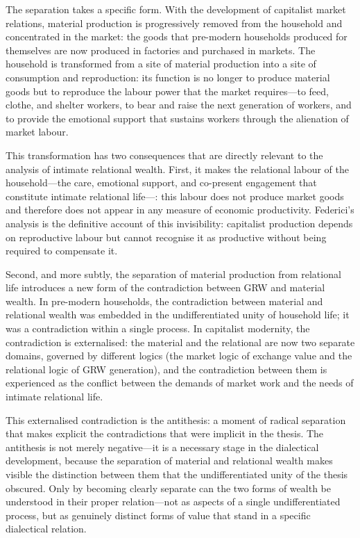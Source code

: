 The separation takes a specific form. With the development of capitalist market relations, material production is progressively removed from the household and concentrated in the market: the goods that pre-modern households produced for themselves are now produced in factories and purchased in markets. The household is transformed from a site of material production into a site of consumption and reproduction: its function is no longer to produce material goods but to reproduce the labour power that the market requires---to feed, clothe, and shelter workers, to bear and raise the next generation of workers, and to provide the emotional support that sustains workers through the alienation of market labour.

This transformation has two consequences that are directly relevant to the analysis of intimate relational wealth. First, it makes the relational labour of the household---the care, emotional support, and co-present engagement that constitute intimate relational life---: this labour does not produce market goods and therefore does not appear in any measure of economic productivity. Federici's analysis \parencite{federici2004} is the definitive account of this invisibility: capitalist production depends on reproductive labour but cannot recognise it as productive without being required to compensate it.

Second, and more subtly, the separation of material production from relational life introduces a new form of the contradiction between GRW and material wealth. In pre-modern households, the contradiction between material and relational wealth was embedded in the undifferentiated unity of household life; it was a contradiction within a single process. In capitalist modernity, the contradiction is externalised: the material and the relational are now two separate domains, governed by different logics (the market logic of exchange value and the relational logic of GRW generation), and the contradiction between them is experienced as the conflict between the demands of market work and the needs of intimate relational life.

This externalised contradiction is the antithesis: a moment of radical separation that makes explicit the contradictions that were implicit in the thesis. The antithesis is not merely negative---it is a necessary stage in the dialectical development, because the separation of material and relational wealth makes visible the distinction between them that the undifferentiated unity of the thesis obscured. Only by becoming clearly separate can the two forms of wealth be understood in their proper relation---not as aspects of a single undifferentiated process, but as genuinely distinct forms of value that stand in a specific dialectical relation.

